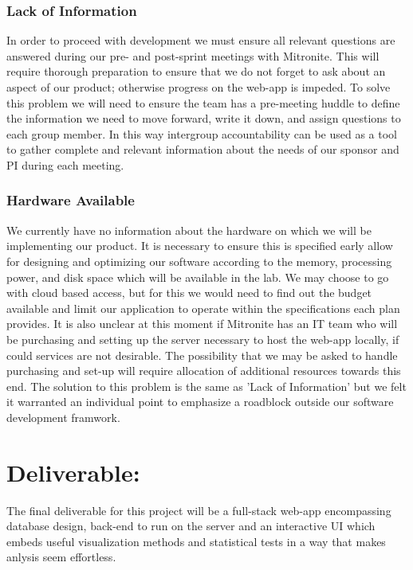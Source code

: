 \documentclass[10pt,twocolumn,letterpaper]{article}
\begin{document}
            \subsubsection{Lack of Information}
                    In order to proceed with development we must ensure all relevant questions are answered during our pre- and post-sprint meetings with Mitronite. This will require thorough preparation to ensure that we do not forget to ask about an aspect of our product; otherwise progress on the web-app is impeded. To solve this problem we will need to ensure the team has a pre-meeting huddle to define the information we need to move forward, write it down, and assign questions to each group member. In this way intergroup accountability can be used as a tool to gather complete and relevant information about the needs of our sponsor and PI during each meeting.
            \subsubsection{Hardware Available}
                     We currently have no information about the hardware on which we will be implementing our product. It is necessary to ensure this is specified early allow for designing and optimizing our software according to the memory, processing power, and disk space which will be available in the lab. We may choose to go with cloud based access, but for this we would need to find out the budget available and limit our application to operate within the specifications each plan provides. It is also unclear at this moment if Mitronite has an IT team who will be purchasing and setting up the server necessary to host the web-app locally, if could services are not desirable. The possibility that we may be asked to handle purchasing and set-up will require allocation of additional resources towards this end. The solution to this problem is the same as 'Lack of Information' but we felt it warranted an individual point to emphasize a roadblock outside our software development framwork.

    	\section{Deliverable:}

        The final deliverable for this project will be a full-stack web-app encompassing database design, back-end to run on the server and an interactive UI which embeds useful visualization methods and statistical tests in a way that makes anlysis seem effortless.
\end{document}

